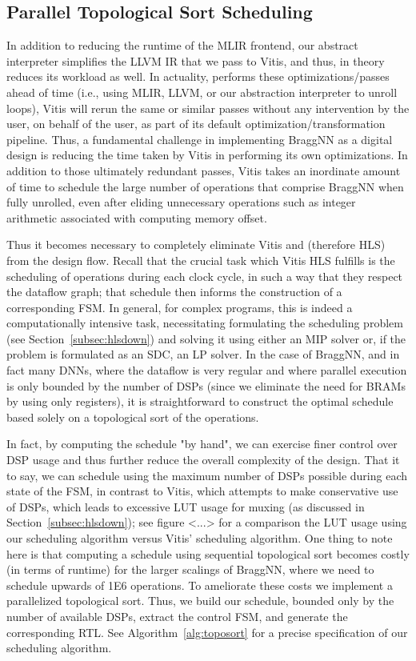 \subsection{Parallel Topological Sort Scheduling}\label{subsec:parallel-toposort-scheduling}

In addition to reducing the runtime of the MLIR frontend, our abstract interpreter simplifies the LLVM IR that we pass to Vitis, and thus, in theory reduces its workload as well.
In actuality, performs these optimizations/passes ahead of time (i.e., using MLIR, LLVM, or our abstraction interpreter to unroll loops), Vitis will rerun the same or similar passes without any intervention by the user, on behalf of the user, as part of its default optimization/transformation pipeline.
Thus, a fundamental challenge in implementing BraggNN as a digital design is reducing the time taken by Vitis in performing its own optimizations.
In addition to those ultimately redundant passes, Vitis takes an inordinate amount of time to schedule the large number of operations that comprise BraggNN when fully unrolled, even after eliding unnecessary operations such as integer arithmetic associated with computing memory offset.

Thus it becomes necessary to completely eliminate Vitis and (therefore HLS) from the design flow.
Recall that the crucial task which Vitis HLS fulfills is the scheduling of operations during each clock cycle, in such a way that they respect the dataflow graph; that schedule then informs the construction of a corresponding FSM.
In general, for complex programs, this is indeed a computationally intensive task, necessitating formulating the scheduling problem (see Section~\ref{subsec:hlsdown}) and solving it using either an MIP solver or, if the problem is formulated as an SDC, an LP solver.
In the case of BraggNN, and in fact many DNNs, where the dataflow is very regular and where parallel execution is only bounded by the number of DSPs (since we eliminate the need for BRAMs by using only registers), it is straightforward to construct the optimal schedule based solely on a topological sort of the operations.

In fact, by computing the schedule "by hand", we can exercise finer control over DSP usage and thus further reduce the overall complexity of the design.
That it to say, we can schedule using the maximum number of DSPs possible during each state of the FSM, in contrast to Vitis, which attempts to make conservative use of DSPs, which leads to excessive LUT usage for muxing (as discussed in Section~\ref{subsec:hlsdown}); see figure <...> for a comparison the LUT usage using our scheduling algorithm versus Vitis' scheduling algorithm.
One thing to note here is that computing a schedule using sequential topological sort becomes costly (in terms of runtime) for the larger scalings of BraggNN, where we need to schedule upwards of 1E6 operations.
To ameliorate these costs we implement a parallelized topological sort\cite{sanders2019sequential}.
Thus, we build our schedule, bounded only by the number of available DSPs, extract the control FSM, and generate the corresponding RTL.
See Algorithm~\ref{alg:toposort} for a precise specification of our scheduling algorithm.

